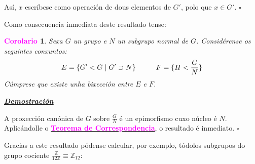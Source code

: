 \documentclass[twoside]{report}
\newcommand{\magbf}[1]{\textcolor{magenta}{\textbf{#1}}} %
\theoremstyle{mystyle}
\newtheorem{cor}{\magbf{Corolario}}[chapter]
\newenvironment{corollary}
{\begin{mdframed}[linecolor = magenta,backgroundcolor = classicrose, linewidth = 2mm]\begin{cor}}
{\end{cor}\end{mdframed}}
\begin{document}
\noindent Así, $x$ escríbese como operación de dous elementos de $G'$, polo que $x \in G'$. $\square$

\vspace{3mm}

\noindent Como consecuencia inmediata deste resultado tense:

\begin{corollary}
Sexa $G$ un grupo e $N$ un subgrupo normal de $G$. Considérense os seguintes conxuntos:
$$E = \{G' < G \hspace{1mm} | \hspace{1mm} G' \supset N \} \hspace{10mm} F = \{ H < \displaystyle \frac{G}{N} \}$$
\noindent Cúmprese que existe unha bixección entre $E$ e $F$.
\end{corollary}

\vspace{2mm}

\noindent \textbf{\textit{\underline{Demostración}}}

\vspace{2mm}

\noindent A proxección canónica de $G$ sobre $\displaystyle \frac{G}{N}$ é un epimorfismo cuxo núcleo é $N$. Aplicándolle o \hyperref[th1.8]{\magbf{Teorema de Correspondencia}}, o resultado é inmediato. $\square$

\vspace{3mm}

\noindent Gracias a este resultado pódense calcular, por exemplo, tódolos subgrupos do grupo cociente $\displaystyle \frac{\mathbb{Z}}{12\mathbb{Z}} \equiv \mathbb{Z}_{12}$:\\
\end{document}
